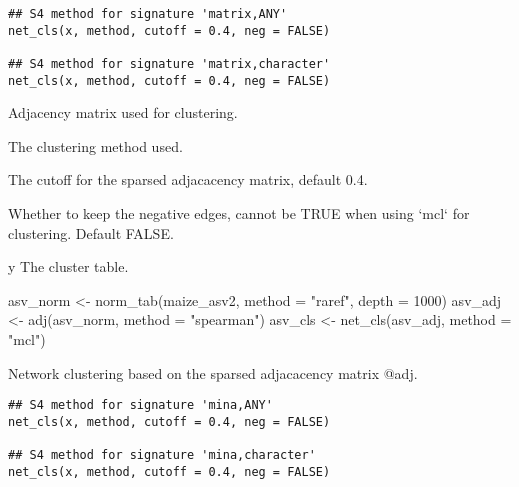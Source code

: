 \documentclass[a4paper]{book}
\begin{document}
%
\begin{Usage}
\begin{verbatim}
## S4 method for signature 'matrix,ANY'
net_cls(x, method, cutoff = 0.4, neg = FALSE)

## S4 method for signature 'matrix,character'
net_cls(x, method, cutoff = 0.4, neg = FALSE)
\end{verbatim}
\end{Usage}
%
\begin{Arguments}
\begin{ldescription}
\item[\code{x}] Adjacency matrix used for clustering.

\item[\code{method}] The clustering method used.

\item[\code{cutoff}] The cutoff for the sparsed adjacacency matrix, default 0.4.

\item[\code{neg}] Whether to keep the negative edges, cannot be TRUE when using
`mcl` for clustering. Default FALSE.
\end{ldescription}
\end{Arguments}
%
\begin{Value}
y The cluster table.
\end{Value}
%
\begin{Examples}
\begin{ExampleCode}
asv_norm <- norm_tab(maize_asv2, method = "raref", depth = 1000)
asv_adj <- adj(asv_norm, method = "spearman")
asv_cls <- net_cls(asv_adj, method = "mcl")
\end{ExampleCode}
\end{Examples}
%
\begin{Description}\relax
Network clustering based on the sparsed adjacacency matrix @adj.
\end{Description}
%
\begin{Usage}
\begin{verbatim}
## S4 method for signature 'mina,ANY'
net_cls(x, method, cutoff = 0.4, neg = FALSE)

## S4 method for signature 'mina,character'
net_cls(x, method, cutoff = 0.4, neg = FALSE)
\end{verbatim}
\end{Usage}
\end{document}

